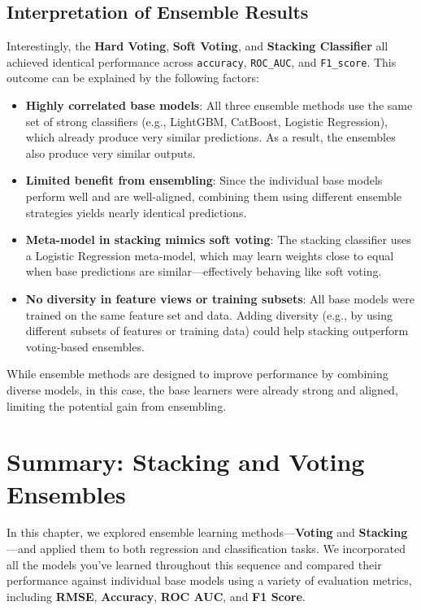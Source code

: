 \documentclass[
  letterpaper,
  DIV=11,
  numbers=noendperiod]{scrreprt}
\begin{document}
\subsection{Interpretation of Ensemble
Results}\label{interpretation-of-ensemble-results}

Interestingly, the \textbf{Hard Voting}, \textbf{Soft Voting}, and
\textbf{Stacking Classifier} all achieved identical performance across
\texttt{accuracy}, \texttt{ROC\_AUC}, and \texttt{F1\_score}. This
outcome can be explained by the following factors:

\begin{itemize}
\item
  \textbf{Highly correlated base models}: All three ensemble methods use
  the same set of strong classifiers (e.g., LightGBM, CatBoost, Logistic
  Regression), which already produce very similar predictions. As a
  result, the ensembles also produce very similar outputs.
\item
  \textbf{Limited benefit from ensembling}: Since the individual base
  models perform well and are well-aligned, combining them using
  different ensemble strategies yields nearly identical predictions.
\item
  \textbf{Meta-model in stacking mimics soft voting}: The stacking
  classifier uses a Logistic Regression meta-model, which may learn
  weights close to equal when base predictions are similar---effectively
  behaving like soft voting.
\item
  \textbf{No diversity in feature views or training subsets}: All base
  models were trained on the same feature set and data. Adding diversity
  (e.g., by using different subsets of features or training data) could
  help stacking outperform voting-based ensembles.
\end{itemize}

While ensemble methods are designed to improve performance by combining
diverse models, in this case, the base learners were already strong and
aligned, limiting the potential gain from ensembling.

\section{Summary: Stacking and Voting
Ensembles}\label{summary-stacking-and-voting-ensembles}

In this chapter, we explored ensemble learning methods---\textbf{Voting}
and \textbf{Stacking}---and applied them to both regression and
classification tasks. We incorporated all the models you've learned
throughout this sequence and compared their performance against
individual base models using a variety of evaluation metrics, including
\textbf{RMSE}, \textbf{Accuracy}, \textbf{ROC AUC}, and \textbf{F1
Score}.
\end{document}
